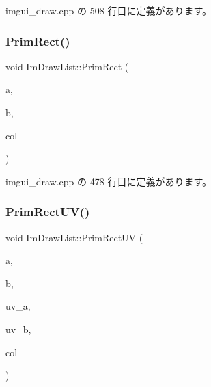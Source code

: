  imgui\+\_\+draw.\+cpp の 508 行目に定義があります。

\mbox{\label{struct_im_draw_list_ae2be093563f1d20b8190b7c423113925}} 
\subsubsection{\texorpdfstring{Prim\+Rect()}{PrimRect()}}
{\footnotesize\ttfamily void Im\+Draw\+List\+::\+Prim\+Rect (\begin{DoxyParamCaption}\item[{const \mbox{\hyperlink{struct_im_vec2}{Im\+Vec2}} \&}]{a,  }\item[{const \mbox{\hyperlink{struct_im_vec2}{Im\+Vec2}} \&}]{b,  }\item[{\mbox{\hyperlink{imgui_8h_a118cff4eeb8d00e7d07ce3d6460eed36}{Im\+U32}}}]{col }\end{DoxyParamCaption})}



 imgui\+\_\+draw.\+cpp の 478 行目に定義があります。

\mbox{\label{struct_im_draw_list_a77d48ed5b33ccdd908824c0a3bebfff8}} 
\subsubsection{\texorpdfstring{Prim\+Rect\+U\+V()}{PrimRectUV()}}
{\footnotesize\ttfamily void Im\+Draw\+List\+::\+Prim\+Rect\+UV (\begin{DoxyParamCaption}\item[{const \mbox{\hyperlink{struct_im_vec2}{Im\+Vec2}} \&}]{a,  }\item[{const \mbox{\hyperlink{struct_im_vec2}{Im\+Vec2}} \&}]{b,  }\item[{const \mbox{\hyperlink{struct_im_vec2}{Im\+Vec2}} \&}]{uv\+\_\+a,  }\item[{const \mbox{\hyperlink{struct_im_vec2}{Im\+Vec2}} \&}]{uv\+\_\+b,  }\item[{\mbox{\hyperlink{imgui_8h_a118cff4eeb8d00e7d07ce3d6460eed36}{Im\+U32}}}]{col }\end{DoxyParamCaption})}



